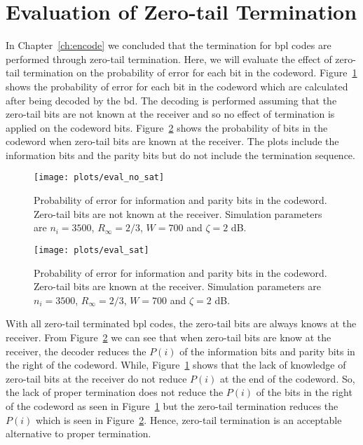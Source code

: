 \section{Evaluation of Zero-tail Termination}
In Chapter~\ref{ch:encode} we concluded that the termination for \gls{bpl} codes are performed through zero-tail termination. Here, we will evaluate the effect of zero-tail termination on the probability of error for each bit in the codeword. Figure~\ref{fig:eval_no_sat} shows the probability of error for each bit in the codeword which are calculated after being decoded by the \gls{bd}. The decoding is performed assuming that the zero-tail bits are not known at the receiver and so no effect of termination is applied on the codeword bits. Figure~\ref{fig:eval_sat} shows the probability of bits in the codeword when zero-tail bits are known at the receiver. The plots include the information bits and the parity bits but do not include the termination sequence.
\begin{figure}[htbp]
  \centering
  \texttt{[image: plots/eval\_no\_sat]}
  \caption{Probability of error for information and parity bits in the codeword. Zero-tail bits are not known at the receiver. Simulation parameters are $n_i=3500$, $R_\infty=2/3$, $W=700$ and $\zeta=2$ dB.}
  \label{fig:eval_no_sat}
\end{figure}

\begin{figure}[htbp]
  \centering
  \texttt{[image: plots/eval\_sat]}
  \caption{Probability of error for information and parity bits in the codeword. Zero-tail bits are known at the receiver. Simulation parameters are $n_i=3500$, $R_\infty=2/3$, $W=700$ and $\zeta=2$ dB.}
  \label{fig:eval_sat}
\end{figure}

With all zero-tail terminated \gls{bpl} codes, the zero-tail bits are always knows at the receiver. 
From Figure~\ref{fig:eval_sat} we can see that when zero-tail bits are know at the receiver, the decoder reduces the $P(i)$ of the information bits and parity bits in the right of the codeword. While, Figure~\ref{fig:eval_no_sat} shows that the lack of knowledge of zero-tail bits at the receiver do not reduce $P(i)$ at the end of the codeword. So, the lack of proper termination does not reduce the $P(i)$ of the bits in the right of the codeword as seen in Figure~\ref{fig:eval_no_sat} but the zero-tail termination reduces the $P(i)$ which is seen in Figure~\ref{fig:eval_sat}. Hence, zero-tail termination is an acceptable alternative to proper termination.
 
